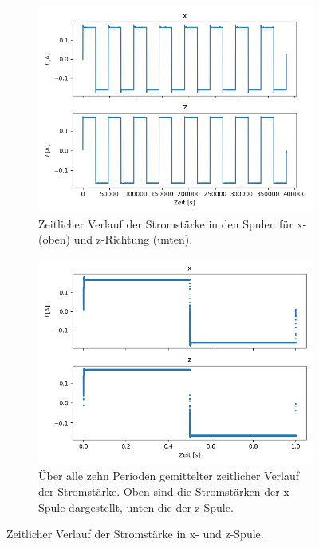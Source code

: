 \documentclass[page,pdftex,12pt,a4paper,twoside,openright]{scrbook}
\begin{document}
\begin{figure}
\centering
\begin{subfigure}[t]{.5\textwidth}
\includegraphics[width=\textwidth]{./img/strom.png}
\caption{Zeitlicher Verlauf der Stromstärke in den Spulen für x- (oben) und z-Richtung (unten).}
\label{fig-stromraw}
\end{subfigure}%
\begin{subfigure}[t]{.5\textwidth}
\includegraphics[width=\textwidth]{./img/strom_avg.png}
\caption{Über alle zehn Perioden gemittelter zeitlicher Verlauf der Stromstärke. Oben sind die Stromstärken der x-Spule dargestellt, unten die der z-Spule.}
\label{fig-strom_avg}
\end{subfigure}
\caption{Zeitlicher Verlauf der Stromstärke in x- und z-Spule.}
\end{figure}
\end{document}
